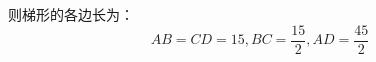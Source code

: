 \documentclass[answers]{exam}
\begin{document}
\begin{questions}
\begin{solution}
		则梯形的各边长为：
		\begin{equation*}
			AB = CD = 15, BC = \frac{15}{2}, AD = \frac{45}{2}
		\end{equation*}
	\end{solution}

\end{questions}
\end{document}
